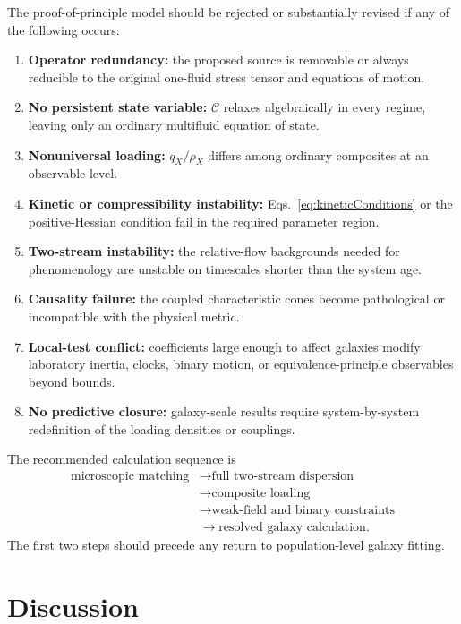 \documentclass[11pt]{article}
\begin{document}
The proof-of-principle model should be rejected or substantially revised if any of the following occurs:
\begin{enumerate}[label=(\arabic*)]
\item \textbf{Operator redundancy:} the proposed source is removable or always reducible to the original one-fluid stress tensor and equations of motion.
\item \textbf{No persistent state variable:} $\mathcal C$ relaxes algebraically in every regime, leaving only an ordinary multifluid equation of state.
\item \textbf{Nonuniversal loading:} $q_X/\rho_X$ differs among ordinary composites at an observable level.
\item \textbf{Kinetic or compressibility instability:} Eqs.~\eqref{eq:kineticConditions} or the positive-Hessian condition fail in the required parameter region.
\item \textbf{Two-stream instability:} the relative-flow backgrounds needed for phenomenology are unstable on timescales shorter than the system age.
\item \textbf{Causality failure:} the coupled characteristic cones become pathological or incompatible with the physical metric.
\item \textbf{Local-test conflict:} coefficients large enough to affect galaxies modify laboratory inertia, clocks, binary motion, or equivalence-principle observables beyond bounds.
\item \textbf{No predictive closure:} galaxy-scale results require system-by-system redefinition of the loading densities or couplings.
\end{enumerate}

The recommended calculation sequence is
\begin{equation}
\begin{aligned}
\text{microscopic matching}
&\longrightarrow \text{full two-stream dispersion}\\
&\longrightarrow \text{composite loading}\\
&\longrightarrow \text{weak-field and binary constraints}\\
&\longrightarrow \text{resolved galaxy calculation}.
\end{aligned}
\label{eq:program}
\end{equation}
The first two steps should precede any return to population-level galaxy fitting.

\section{Discussion}
\end{document}
